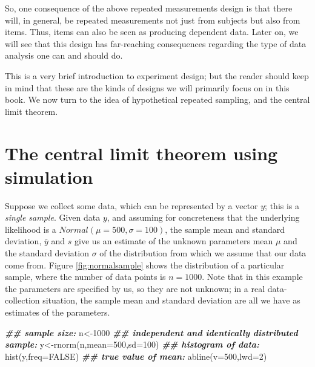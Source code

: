 \documentclass[
  12pt,
]{krantz}
\newenvironment{Shaded}{\begin{snugshade}}{\end{snugshade}}
\newcommand{\AttributeTok}[1]{\textcolor[rgb]{0.77,0.63,0.00}{#1}}
\newcommand{\ConstantTok}[1]{\textcolor[rgb]{0.00,0.00,0.00}{#1}}
\newcommand{\DecValTok}[1]{\textcolor[rgb]{0.00,0.00,0.81}{#1}}
\newcommand{\DocumentationTok}[1]{\textcolor[rgb]{0.56,0.35,0.01}{\textbf{\textit{#1}}}}
\newcommand{\FunctionTok}[1]{\textcolor[rgb]{0.00,0.00,0.00}{#1}}
\newcommand{\NormalTok}[1]{#1}
\newcommand{\OtherTok}[1]{\textcolor[rgb]{0.56,0.35,0.01}{#1}}
\theoremstyle{definition}
\theoremstyle{definition}
\theoremstyle{definition}
\theoremstyle{definition}
\theoremstyle{remark}
\begin{document}
So, one consequence of the above repeated measurements design is that there will, in general, be repeated measurements not just from subjects but also from items. Thus, items can also be seen as producing dependent data. Later on, we will see that this design has far-reaching consequences regarding the type of data analysis one can and should do.

This is a very brief introduction to experiment design; but the reader should keep in mind that these are the kinds of designs we will primarily focus on in this book.
We now turn to the idea of hypothetical repeated sampling, and the central limit theorem.

\hypertarget{the-central-limit-theorem-using-simulation}{%
\section{The central limit theorem using simulation}\label{the-central-limit-theorem-using-simulation}}

Suppose we collect some data, which can be represented by a vector \(y\); this is a \emph{single sample}. Given data \(y\), and assuming for concreteness that the underlying likelihood is a \(Normal(\mu=500,\sigma=100)\), the sample mean and standard deviation, \(\bar{y}\) and \(s\) give us an estimate of the unknown parameters mean \(\mu\) and the standard deviation \(\sigma\) of the distribution from which we assume that our data come from. Figure \ref{fig:normalsample} shows the distribution of a particular sample, where the number of data points is \(n=1000\). Note that in this example the parameters are specified by us, so they are not unknown; in a real data-collection situation, the sample mean and standard deviation are all we have as estimates of the parameters.



\begin{Shaded}
\begin{Highlighting}[]
\DocumentationTok{\#\# sample size:}
\NormalTok{n}\OtherTok{\textless{}{-}}\DecValTok{1000}
\DocumentationTok{\#\#  independent and identically distributed sample:}
\NormalTok{y}\OtherTok{\textless{}{-}}\FunctionTok{rnorm}\NormalTok{(n,}\AttributeTok{mean=}\DecValTok{500}\NormalTok{,}\AttributeTok{sd=}\DecValTok{100}\NormalTok{)}
\DocumentationTok{\#\# histogram of data:}
\FunctionTok{hist}\NormalTok{(y,}\AttributeTok{freq=}\ConstantTok{FALSE}\NormalTok{)}
\DocumentationTok{\#\# true value of mean:}
\FunctionTok{abline}\NormalTok{(}\AttributeTok{v=}\DecValTok{500}\NormalTok{,}\AttributeTok{lwd=}\DecValTok{2}\NormalTok{)}
\end{Highlighting}
\end{Shaded}
\end{document}
